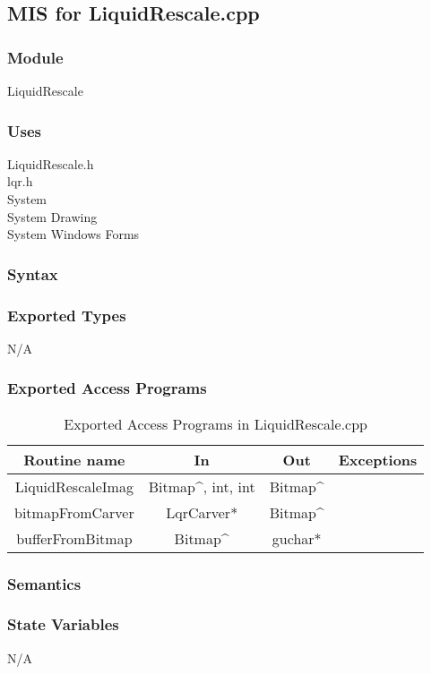 \documentclass{article}
\begin{document}
\newpage

\subsection{MIS for LiquidRescale.cpp}

\subsubsection*{Module}
LiquidRescale

\subsubsection* {Uses}
LiquidRescale.h \\
lqr.h \\
System \\
System Drawing \\
System Windows Forms

\subsubsection* {Syntax}
\subsubsection* {Exported Types}
N/A

\subsubsection* {Exported Access Programs}
\begin{table}[h!]
  \centering
  \caption{Exported Access Programs in LiquidRescale.cpp}
  \begin{tabular}{|c|c|c|c|}
    \hline
    Routine name & In & Out & Exceptions \\
    \hline
    LiquidRescaleImag & Bitmap\^{}, int, int & Bitmap\^{} & \\
    \hline
    bitmapFromCarver & LqrCarver* & Bitmap\^{}  & \\
    \hline
    bufferFromBitmap & Bitmap\^{} & guchar*  & \\
    \hline
  \end{tabular}
\end{table}

\subsubsection* {Semantics}
\subsubsection* {State Variables}
N/A
\end{document}
